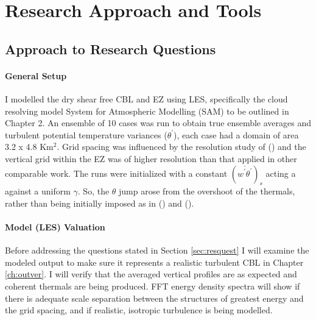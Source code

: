 
\chapter{Research Approach and Tools}

\label{ch:tools}
\setlength{\parindent}{0cm}
\section{Approach to Research Questions}
\label{sec:Approach}
\subsubsection{General Setup}

I modelled the dry shear free \acs{CBL} and \acs{EZ} using \acs{LES}, specifically the cloud resolving model System for Atmospheric Modelling (SAM) to be outlined in Chapter 2.  An ensemble of 10 cases was run to obtain true ensemble averages and turbulent potential temperature variances ($\theta^{'}$), each case had a domain of area 3.2 x 4.8 Km$^{2}$. Grid spacing was influenced by the resolution study of \citeauthor{SullPat} (\citeyear{SullPat}) and the vertical grid within the \acs{EZ} was of higher resolution than that applied in other comparable work.  The runs were initialized with a constant $(\overline{w^{'}\theta^{'}})_{s}$ acting a against a uniform $\gamma$.  So, the  $\theta$ jump arose from the overshoot of the thermals, rather than being initially imposed as in \citeauthor{SullMoengStev} (\citeyear{SullMoengStev}) and \citeauthor{BrooksFowler2} (\citeyear{BrooksFowler2}).\\

\subsubsection{Model (\acs{LES}) Valuation}

Before addressing the questions stated in Section \ref{sec:resquest} I will examine the modeled output to make sure it represents a realistic turbulent \acs{CBL} in Chapter \ref{ch:outver}. I will verify that the averaged vertical profiles are as expected and coherent thermals are being produced.  FFT energy density spectra will show if there is adequate scale separation between the structures of greatest energy and the grid spacing, and if realistic, isotropic turbulence is being modelled.  

